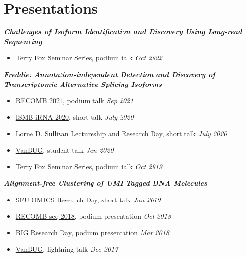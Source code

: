 \documentclass[margin]{res}
\begin{document}
\begin{resume}
\begin{enumerate}[leftmargin=*]
\end{enumerate}



    \section{Presentations}
	\textbf{\textit{Challenges of Isoform Identification and Discovery Using Long-read Sequencing}} \\
    \vspace{-1em}
    \begin{itemize}[leftmargin=*]
        \item Terry Fox Seminar Series, podium talk  \hfill \textit{Oct 2022}
	\end{itemize}

	\textbf{\textit{Freddie: Annotation-independent Detection and Discovery of Transcriptomic Alternative Splicing Isoforms}} \\
    \vspace{-1em}
    \begin{itemize}[leftmargin=*]
	    \item \href{https://www.recomb2021.org/accepted-papers}{RECOMB 2021}, podium talk   \hfill \textit{Sep 2021}
	    \item \href{https://www.iscb.org/cms_addon/conferences/ismb2020/tracks/rnacosi}{ISMB iRNA 2020}, short talk  \hfill \textit{July 2020}
	    \item {Lorne D. Sullivan Lectureship and Research Day}, short talk  \hfill \textit{July 2020}
        \item \href{http://www.vanbug.org/2020/raymond-ng/}{VanBUG}, student talk  \hfill \textit{Jan 2020}
        \item Terry Fox Seminar Series, podium talk  \hfill \textit{Oct 2019}
	\end{itemize}


	\textbf{\textit{Alignment-free Clustering of UMI Tagged DNA Molecules}} \\
    \vspace{-1em}
    \begin{itemize}[leftmargin=*]
	    \item \href{https://sites.google.com/site/sfuomics/omics-research-day/research2020}{SFU OMICS Research Day}, short talk  \hfill \textit{Jan 2019}
	    \item \href{https://web.archive.org/web/20180709093254/http://recomb2018.fr/recomb-seq}{RECOMB-seq 2018}, podium presentation  \hfill \textit{Oct 2018}
        \item \href{https://www.bigresearchday.com/}{BIG Research Day}, podium presentation  \hfill \textit{Mar 2018}
        \item \href{http://www.vanbug.org/}{VanBUG}, lightning talk  \hfill \textit{Dec 2017}
	\end{itemize}
    	

\end{resume}
\end{document}
